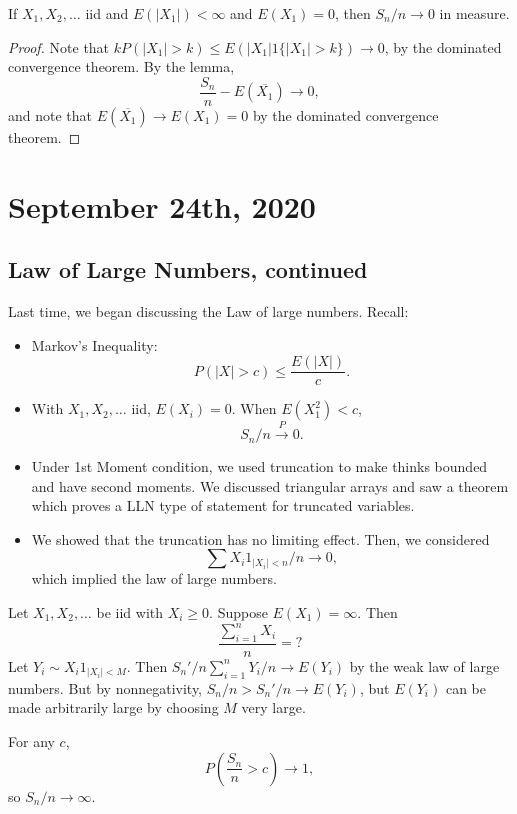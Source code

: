 \documentclass[11pt]{scrartcl}
\begin{document}
\begin{thm} If $X_1, X_2, \dots$ iid and $E(|X_1|) < \infty$ and $E(X_1)  = 0$, then $S_n/n \rightarrow 0$ in measure.
\end{thm}
\begin{proof}
Note that $kP(|X_1| > k)  \le E(|X_1| 1\{|X_1| > k\}) \rightarrow 0$, by the dominated convergence theorem. By the lemma,
$$\frac{S_n}{n} - E(\overline{X_1}) \rightarrow 0,$$
and note that $E(\overline{X_1}) \rightarrow E(X_1) = 0$ by the dominated convergence theorem.
\end{proof}
\pagebreak
\section{September 24th, 2020}
\subsection{Law of Large Numbers, continued}
Last time, we began discussing the Law of large numbers.  Recall:
\begin{itemize}
\item Markov's Inequality: $$P(|X| > c) \le \frac{E(|X|)}{c}.$$
\item With $X_1, X_2, \dots$ iid, $E(X_i) = 0$.  When $E(X_1^2) < c$, 
$$S_n/n \xrightarrow{P} 0.$$
\item Under 1st Moment condition, we used truncation to make thinks bounded and have second moments.  We discussed triangular arrays and saw a theorem which proves a LLN type of statement for truncated variables.
\item We showed that the truncation has no limiting effect.  Then, we considered 
$$\sum X_i 1_{|X_i| < n}/n \rightarrow 0,$$
which implied the law of large numbers.
\end{itemize}
\begin{example} Let $X_1, X_2, \dots$ be iid with $X_i \ge 0$.  Suppose $E(X_1) = \infty$.  Then
$$\frac{\sum_{i=1}^n X_i}{n} = ?$$
Let $Y_i \sim X_i 1_{|X_i| < M}$.  Then $S_n'/n \sum_{i=1}^n Y_i/n \rightarrow E(Y_i)$ by the weak law of large numbers.  But by nonnegativity, $S_n/n > S_n'/n \rightarrow E(Y_i)$, but $E(Y_i)$ can be made arbitrarily large by choosing $M$ very large.  

For any $c$,
$$P\left (\frac{S_n}{n} > c\right ) \rightarrow 1,$$
so $S_n/n \rightarrow \infty$. 
\end{example}
\end{document}
